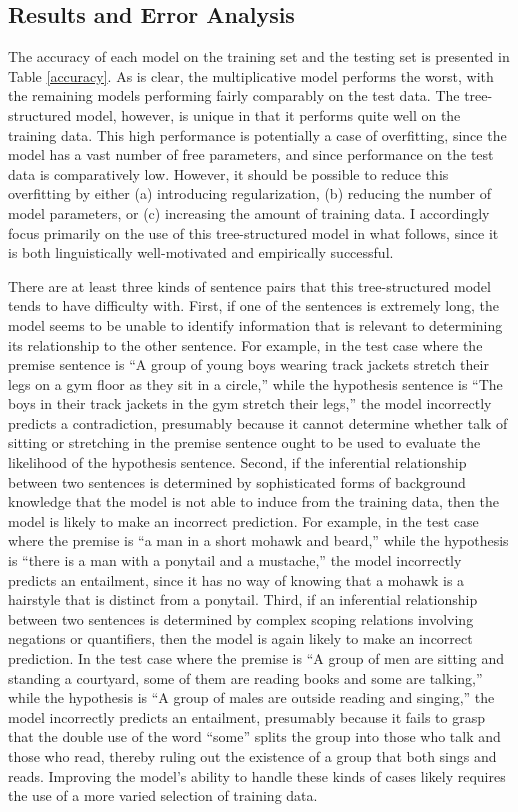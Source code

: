 \subsection{Results and Error Analysis}

The accuracy of each model on the training set and the testing set is presented in Table \ref{accuracy}. As is clear, the multiplicative model performs the worst, with the remaining models performing fairly comparably on the test data. The tree-structured model, however, is unique in that it performs quite well on the training data. This high performance is potentially a case of overfitting, since the model has a vast number of free parameters, and since performance on the test data is comparatively low. However, it should be possible to reduce this overfitting by either (a) introducing regularization, (b) reducing the number of model parameters, or (c) increasing the amount of training data. I accordingly focus primarily on the use of this tree-structured model in what follows, since it is both linguistically well-motivated and empirically successful.

There are at least three kinds of sentence pairs that this tree-structured model tends to have difficulty with. First, if one of the sentences is extremely long, the model seems to be unable to identify information that is relevant to determining its relationship to the other sentence. For example, in the test case where the premise sentence is ``A group of young boys wearing track jackets stretch their legs on a gym floor as they sit in a circle,'' while the hypothesis sentence is ``The boys in their track jackets in the gym stretch their legs,'' the model incorrectly predicts a contradiction, presumably because it cannot determine whether talk of sitting or stretching in the premise sentence ought to be used to evaluate the likelihood of the hypothesis sentence. Second, if the inferential relationship between two sentences is determined by sophisticated forms of background knowledge that the model is not able to induce from the training data, then the model is likely to make an incorrect prediction. For example, in the test case where the premise is ``a man in a short mohawk and beard,'' while the hypothesis is ``there is a man with a ponytail and a mustache,'' the model incorrectly predicts an entailment, since it has no way of knowing that a mohawk is a hairstyle that is distinct from a ponytail. Third, if an inferential relationship between two sentences is determined by complex scoping relations involving negations or quantifiers, then the model is again likely to make an incorrect prediction. In the test case where the premise is ``A group of men are sitting and standing a courtyard, some of them are reading books and some are talking,'' while the hypothesis is ``A group of males are outside reading and singing,'' the model incorrectly predicts an entailment, presumably because it fails to grasp that the double use of the word ``some'' splits the group into those who talk and those who read, thereby ruling out the existence of a group that both sings and reads. Improving the model's ability to handle these kinds of cases likely requires the use of a more varied selection of training data.  

